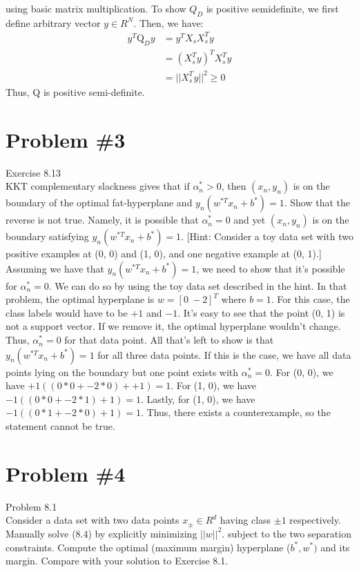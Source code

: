 \documentclass[12pt]{article}
\begin{document}
	using basic matrix multiplication.
	To show $Q_D$ is positive semidefinite, we first define arbitrary vector $y \in R^N$. Then, we have:
	\begin{align*}
		y^T \text{Q}_D y &= y^T X_sX_s^Ty \\
		&= (X_s^Ty)^T X_s^Ty\\
		&= ||X_s^Ty||^2 \ge 0
	\end{align*}
	Thus, Q is positive semi-definite.
	\section*{Problem \#3}
	Exercise 8.13 \\
	KKT complementary slackness gives that if $\alpha_n^* > 0$, then $(x_n , y_n)$ is on
	the boundary of the optimal fat-hyperplane and $y_n (w^{*T} x_n + b^{*} ) = 1$.
	Show that the reverse is not true. Namely, it is possible that $\alpha_n^* = 0$ and
	yet $(x_n , y_n)$ is on the boundary satisfying $y_n (w^{*T} x_n + b^{*} ) = 1$.
	[Hint: Consider a toy data set with two positive examples at (0, 0) and
	(1, 0), and one negative example at (0, 1).] \\
	Assuming we have that $y_n (w^{*T} x_n + b^{*} ) = 1$, we need to show that it's possible for $\alpha_n^* = 0$. We can do so by using the toy data set described in the hint. In that problem, the optimal hyperplane is $w = [0 \ -2]^T$ where $b=1$. For this case, the class labels would have to be $+1$ and $-1$. It's easy to see that the point (0, 1) is not a support vector. If we remove it, the optimal hyperplane wouldn't change. Thus, $\alpha_n^* = 0$ for that data point. All that's left to show is that $y_n (w^{*T} x_n + b^{*} ) = 1$ for all three data points. If this is the case, we have all data points lying on the boundary but one point exists with $\alpha_n^* = 0$. For (0, 0), we have $+1 ((0*0 + -2*0) + +1)=1$. For (1, 0), we have $-1 ((0*0 + -2*1) + 1)=1$. Lastly, for (1, 0), we have $-1 ((0*1 + -2*0) + 1)=1$. Thus, there exists a counterexample, so the statement cannot be true.
	\section*{Problem \#4}
	Problem 8.1 \\
	Consider a data set with two data points $x_{\pm} \in R^d$ having class $\pm1$ respectively. Manually solve (8.4) by explicitly minimizing $||w||^2$.
	subject to the two separation constraints.
	Compute the optimal (maximum margin) hyperplane ($b^* , w^* )$ and its margin.
	Compare with your solution to Exercise 8.1.
	
\end{document}
